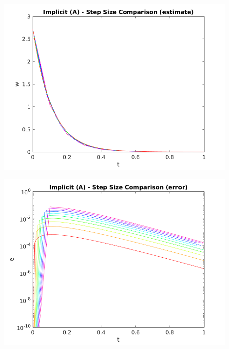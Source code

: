 \documentclass{article}
\begin{document}
\begin{center}
  \includegraphics[width=0.9\textwidth]{../output/a_implicit_h_val.png}
  \label{fig:a_implicit_h_val}
\end{center}

\begin{center}
  \includegraphics[width=0.9\textwidth]{../output/a_implicit_h_err.png}
  \label{fig:a_implicit_h_err}
\end{center}
\end{document}
